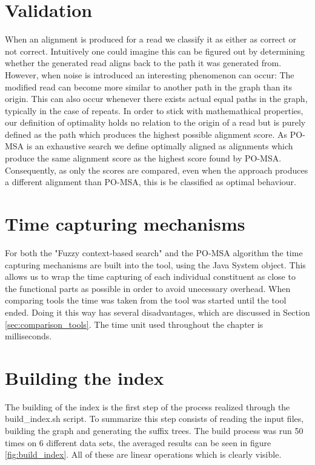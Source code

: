 \documentclass[thesis.tex]{subfiles}
\begin{document}
\section{Validation}
\label{sec:performance_validation}
When an alignment is produced for a read we classify it as either as correct or not correct. Intuitively one could imagine this can be figured out by determining whether the generated read aligns back to the path it was generated from. However, when noise is introduced an interesting phenomenon can occur: The modified read can become more similar to another path in the graph than its origin. This can also occur whenever there exists actual equal paths in the graph, typically in the case of repeats. In order to stick with mathemathical properties, our definition of optimality holds no relation to the origin of a read but is purely defined as the path which produces the highest possible alignment score. As PO-MSA is an exhaustive search we define optimally aligned as alignments which produce the same alignment score as the highest score found by PO-MSA. Consequently, as only the scores are compared, even when the approach produces a different alignment than PO-MSA, this is be classified as optimal behaviour.\\
\par\noindent
\section{Time capturing mechanisms}
For both the "Fuzzy context-based search" and the PO-MSA algorithm the time capturing mechanisms are built into the tool, using the Java System object. This allows us to wrap the time capturing of each individual constituent as close to the functional parts as possible in order to avoid unecessary overhead. When comparing tools the time was taken from the tool was started until the tool ended. Doing it this way has several disadvantages, which are discussed in Section \ref{sec:comparison_tools}. The time unit used throughout the chapter is milliseconds.
\section{Building the index}
The building of the index is the first step of the process realized through the build\_index.sh script. To summarize this step consists of reading the input files, building the graph and generating the suffix trees. The build process was run 50 times on 6 different data sets, the averaged results can be seen in figure \ref{fig:build_index}. All of these are linear operations which is clearly visible.\\
\end{document}
